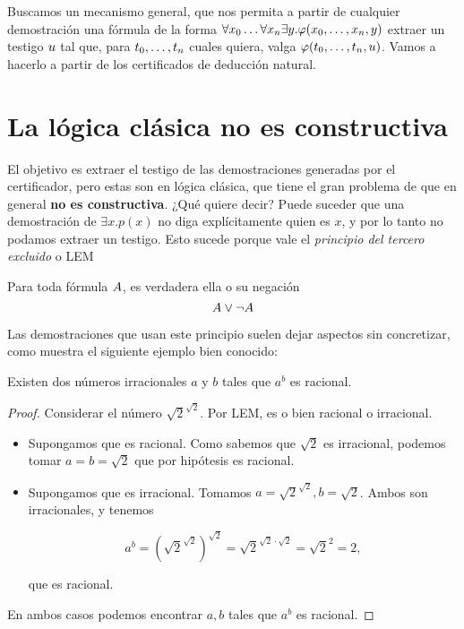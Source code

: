 Buscamos un mecanismo general, que nos permita a partir de cualquier
demostración una fórmula de la forma $\forall x_0 \dots \forall x_n
\exists y . \varphi(x_0, \dots, x_n, y)$ extraer un testigo $u$ tal que, para $t_0, \dots, t_n$ cuales quiera, valga $\varphi(t_0, \dots, t_n, u)$. Vamos a hacerlo a partir
de los certificados de deducción natural.

\section{La lógica clásica no es constructiva}

El objetivo es extraer el testigo de las demostraciones generadas por el
certificador, pero estas son en lógica clásica, que tiene el gran problema de
que en general \textbf{no es constructiva}. ¿Qué quiere decir? Puede suceder que
una demostración de $\exists x . p(x)$ no diga explícitamente quien es $x$, y
por lo tanto no podamos extraer un testigo. Esto sucede porque vale el \textit{principio del tercero excluido} o LEM

\begin{prop}[LEM] Para toda fórmula $A$, es verdadera ella o su negación
    \[ A \vee \neg A \]
\end{prop}

Las demostraciones que usan este principio suelen dejar aspectos sin
concretizar, como muestra el siguiente ejemplo bien conocido:

\begin{theorem}\label{fri:thm:irrat}
    Existen dos números irracionales $a$ y $b$ tales que $a^b$ es racional.
\end{theorem}
\begin{proof}
    Considerar el número $\sqrt{2}^{\sqrt{2}}$. Por LEM, es o bien racional o
    irracional.
    \begin{itemize}
        \item Supongamos que es racional. Como sabemos que $\sqrt{2}$ es
              irracional, podemos tomar $a=b=\sqrt{2}$ que por hipótesis es racional.
        \item Supongamos que es irracional. Tomamos $a = \sqrt{2}^{\sqrt{2}}, b
                  = \sqrt{2}$. Ambos son irracionales, y tenemos

              \[
                  a^b
                  = \left( \sqrt{2}^{\sqrt{2}} \right)^{\sqrt{2}}
                  = \sqrt{2}^{\sqrt{2} \cdot \sqrt{2}}
                  = \sqrt{2}^{2}
                  = 2,
              \]

              que es racional.
    \end{itemize}

    En ambos casos podemos encontrar $a, b$ tales que $a^b$ es racional.
\end{proof}

